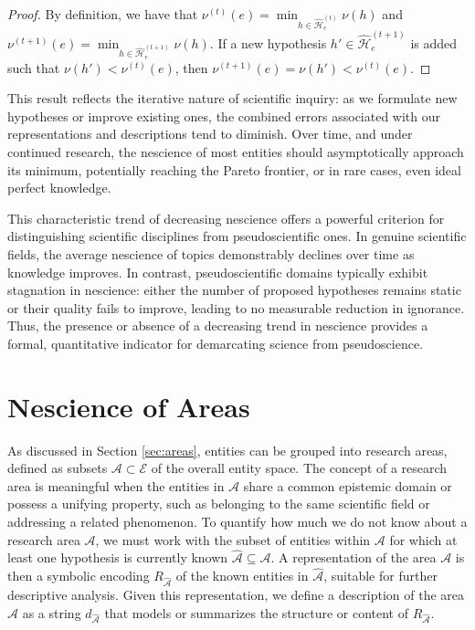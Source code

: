 \begin{proof}
By definition, we have that $\nu^{(t)}(e) = \min_{h \in \hat{\mathcal{H}}^{(t)}_e} \nu(h)$ and $\nu^{(t+1)}(e) = \min_{h \in \hat{\mathcal{H}}^{(t+1)}_e} \nu(h)$. If a new hypothesis $h' \in \hat{\mathcal{H}}^{(t+1)}_e$ is added such that $\nu(h') < \nu^{(t)}(e)$, then $\nu^{(t+1)}(e) = \nu(h') < \nu^{(t)}(e)$.
\end{proof}

This result reflects the iterative nature of scientific inquiry: as we formulate new hypotheses or improve existing ones, the combined errors associated with our representations and descriptions tend to diminish. Over time, and under continued research, the nescience of most entities should asymptotically approach its minimum, potentially reaching the Pareto frontier, or in rare cases, even ideal perfect knowledge.

This characteristic trend of decreasing nescience offers a powerful criterion for distinguishing scientific disciplines from pseudoscientific ones. In genuine scientific fields, the average nescience of topics demonstrably declines over time as knowledge improves. In contrast, pseudoscientific domains typically exhibit stagnation in nescience: either the number of proposed hypotheses remains static or their quality fails to improve, leading to no measurable reduction in ignorance. Thus, the presence or absence of a decreasing trend in nescience provides a formal, quantitative indicator for demarcating science from pseudoscience.

%
%

\section{Nescience of Areas}
\label{sec:nescience_areas}

As discussed in Section \ref{sec:areas}, entities can be grouped into research areas, defined as subsets $\mathcal{A} \subset \mathcal{E}$ of the overall entity space. The concept of a research area is meaningful when the entities in $\mathcal{A}$ share a common epistemic domain or possess a unifying property, such as belonging to the same scientific field or addressing a related phenomenon. To quantify how much we do not know about a research area $\mathcal{A}$, we must work with the subset of entities within $\mathcal{A}$ for which at least one hypothesis is currently known $\hat{\mathcal{A}} \subseteq \mathcal{A}$. A representation of the area $\mathcal{A}$ is then a symbolic encoding $R_{\hat{\mathcal{A}}}$ of the known entities in $\hat{\mathcal{A}}$, suitable for further descriptive analysis. Given this representation, we define a description of the area $\mathcal{A}$ as a string $d_{\hat{\mathcal{A}}}$ that models or summarizes the structure or content of $R_{\hat{\mathcal{A}}}$.


